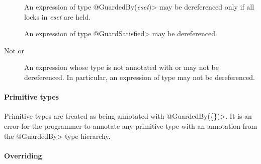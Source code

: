 \begin{description}

\item[]
  An expression of type \<@GuardedBy(\emph{eset})> may be dereferenced only
  if all locks in \emph{eset} are held.

\item[]
  An expression of type \<@GuardSatisfied> may be dereferenced.

\item[Not  or ]
  An expression whose type is not annotated with  or
   may not be dereferenced.
  In particular, an expression of type  may not be dereferenced.

\end{description}

\paragraph{Primitive types}

Primitive types are treated as being annotated with \<@GuardedBy(\{\})>.
It is an error for the programmer to annotate any primitive type with an annotation from
the \<@GuardedBy> type hierarchy.


\paragraph{Overriding}

